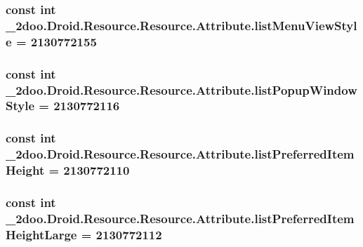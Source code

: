 \hypertarget{class__2doo_1_1_droid_1_1_resource_1_1_attribute_e9d6da15bba94b53b0112cfc2b927e12}{
\subsubsection[{listMenuViewStyle}]{\setlength{\rightskip}{0pt plus 5cm}const int \_\-2doo.Droid.Resource.Resource.Attribute.listMenuViewStyle = 2130772155}}
\label{class__2doo_1_1_droid_1_1_resource_1_1_attribute_e9d6da15bba94b53b0112cfc2b927e12}


\hypertarget{class__2doo_1_1_droid_1_1_resource_1_1_attribute_4d03581384d8a4b4470c032bc2aa9fbe}{
\subsubsection[{listPopupWindowStyle}]{\setlength{\rightskip}{0pt plus 5cm}const int \_\-2doo.Droid.Resource.Resource.Attribute.listPopupWindowStyle = 2130772116}}
\label{class__2doo_1_1_droid_1_1_resource_1_1_attribute_4d03581384d8a4b4470c032bc2aa9fbe}


\hypertarget{class__2doo_1_1_droid_1_1_resource_1_1_attribute_fa49b698982702a540510d2af8980e82}{
\subsubsection[{listPreferredItemHeight}]{\setlength{\rightskip}{0pt plus 5cm}const int \_\-2doo.Droid.Resource.Resource.Attribute.listPreferredItemHeight = 2130772110}}
\label{class__2doo_1_1_droid_1_1_resource_1_1_attribute_fa49b698982702a540510d2af8980e82}


\hypertarget{class__2doo_1_1_droid_1_1_resource_1_1_attribute_5e429e6ec488c3a95c7537efcc23296e}{
\subsubsection[{listPreferredItemHeightLarge}]{\setlength{\rightskip}{0pt plus 5cm}const int \_\-2doo.Droid.Resource.Resource.Attribute.listPreferredItemHeightLarge = 2130772112}}
\label{class__2doo_1_1_droid_1_1_resource_1_1_attribute_5e429e6ec488c3a95c7537efcc23296e}


